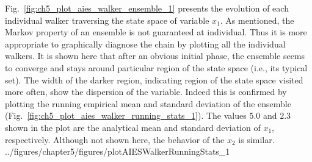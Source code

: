 Fig.~\ref{fig:ch5_plot_aies_walker_ensemble_1} presents the evolution of each individual walker traversing the state space of variable $x_1$.
As mentioned, the Markov property of an ensemble is not guaranteed at individual.
Thus it is more appropriate to graphically diagnose the chain by plotting all the individual walkers.
It is shown here that after an obvious initial phase,
the ensemble seems to converge and stays around particular region of the state space (i.e., its typical set).
The width of the darker region, indicating region of the state space visited more often,
show the dispersion of the variable. 
Indeed this is confirmed by plotting the running empirical mean and standard deviation of the ensemble (Fig.~\ref{fig:ch5_plot_aies_walker_running_stats_1}).
The values $5.0$ and $2.3$ shown in the plot are the analytical mean and standard deviation of $x_1$, respectively.
Although not shown here, the behavior of the  $x_2$ is similar.
{../figures/chapter5/figures/plotAIESWalkerRunningStats_1}


